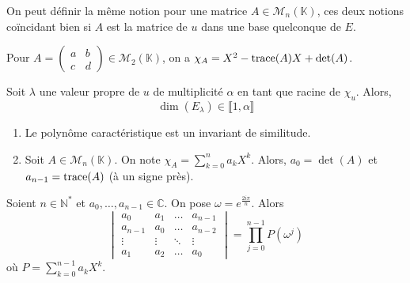   \begin{remark}
    On peut définir la même notion pour une matrice $A \in \mathcal{M}_n(\mathbb{K})$, ces deux notions coïncidant bien si $A$ est la matrice de $u$ dans une base quelconque de $E$.
  \end{remark}

  \begin{example}
    Pour $A = \begin{pmatrix} a & b \\ c & d \end{pmatrix} \in \mathcal{M}_2(\mathbb{K})$, on a $\chi_A = X^2 - \operatorname{trace}(A)X + \det(A)$.
  \end{example}

  \begin{proposition}
    Soit $\lambda$ une valeur propre de $u$ de multiplicité $\alpha$ en tant que racine de $\chi_u$. Alors,
    \[ \dim(E_\lambda) \in \llbracket 1, \alpha \rrbracket \]
  \end{proposition}


  \begin{proposition}
    \begin{enumerate}[label={\bfseries(\roman*)}]
      \item Le polynôme caractéristique est un invariant de similitude.
      \item Soit $A \in \mathcal{M}_n(\mathbb{K})$. On note $\chi_A = \sum_{k=0}^n a_k X^k$. Alors, $a_0 = \det(A)$ et $a_{n-1} = \operatorname{trace}(A)$ (à un signe près).
    \end{enumerate}
  \end{proposition}


  \begin{lemma}
    \label{suite-de-polygones-1}
    Soient $n \in \mathbb{N}^*$ et $a_0, \dots, a_{n-1} \in \mathbb{C}$. On pose $\omega = e^{\frac{2i\pi}{n}}$. Alors
    \[ \begin{vmatrix} a_0 & a_1 & \dots & a_{n-1} \\ a_{n-1} & a_0 & \dots & a_{n-2}\\ \vdots & \vdots & \ddots & \vdots \\ a_1 & a_2 & \dots & a_0 \end{vmatrix} = \prod_{j=0}^{n-1} P(\omega^j) \]
    où $P = \sum_{k=0}^{n-1} a_k X^k$.
  \end{lemma}


